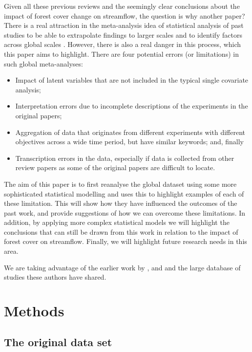 \documentclass[]{elsarticle} %
\providecommand{\tightlist}{%
  \setlength{\itemsep}{0pt}\setlength{\parskip}{0pt}}
\begin{document}
Given all these previous reviews and the seemingly clear conclusions about the impact of forest cover change on streamflow, the question is why another paper?
There is a real attraction in the meta-analysis idea of statistical analysis of past studies to be able to extrapolate findings to larger scales and to identify factors across global scales \citep{evaristo2020metaanalysis}.
However, there is also a real danger in this process, which this paper aims to highlight. There are four potential errors (or limitations) in such global meta-analyses:

\begin{itemize}
\tightlist
\item
  Impact of latent variables that are not included in the typical single covariate analysis;
\item
  Interpretation errors due to incomplete descriptions of the experiments in the original papers;\\
\item
  Aggregation of data that originates from different experiments with different objectives across a wide time period, but have similar keywords; and, finally\\
\item
  Transcription errors in the data, especially if data is collected from other review papers as some of the original papers are difficult to locate.
\end{itemize}

The aim of this paper is to first reanalyse the global dataset using some more sophisticated statistical modelling and uses this to highlight examples of each of these limitation. This will show how they have influenced the outcomes of the past work, and provide suggestions of how we can overcome these limitations. In addition, by applying more complex statistical models we will highlight the conclusions that can still be drawn from this work in relation to the impact of forest cover on streamflow. Finally, we will highlight future research needs in this area.

We are taking advantage of the earlier work by \citet{zhang2017}, \citet{filoso2017} and \citet{zhou2015} and the large database of studies these authors have shared.

\hypertarget{methods}{%
\section{Methods}\label{methods}}

\hypertarget{the-original-data-set}{%
\subsection{The original data set}\label{the-original-data-set}}
\end{document}
